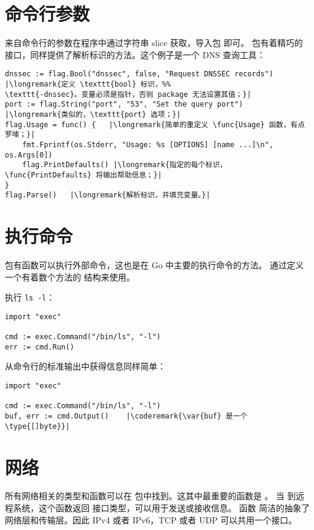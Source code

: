 \section{命令行参数}
\label{sec:option parsing}
来自命令行的参数在程序中通过字符串 slice  获取，导入包  即可。
 包有着精巧的接口，同样提供了解析标识的方法。这个例子是一个 DNS 查询工具：
\begin{lstlisting}
dnssec := flag.Bool("dnssec", false, "Request DNSSEC records") |\longremark{定义 \texttt{bool} 标识，%%
\texttt{-dnssec}。变量必须是指针，否则 package 无法设置其值；}|
port := flag.String("port", "53", "Set the query port")      |\longremark{类似的，\texttt{port} 选项；}|
flag.Usage = func() {   |\longremark{简单的重定义 \func{Usage} 函数，有点罗嗦；}|
    fmt.Fprintf(os.Stderr, "Usage: %s [OPTIONS] [name ...]\n", os.Args[0])
    flag.PrintDefaults() |\longremark{指定的每个标识，\func{PrintDefaults} 将输出帮助信息；}|
}
flag.Parse()   |\longremark{解析标识，并填充变量。}|
\end{lstlisting}
\showremarks

\section{执行命令}
 包有函数可以执行外部命令，这也是在 Go 中主要的执行命令的方法。
通过定义一个有着数个方法的  结构来使用。

执行 \verb|ls -l|：
\begin{lstlisting}
import "exec"

cmd := exec.Command("/bin/ls", "-l")
err := cmd.Run()
\end{lstlisting}
从命令行的标准输出中获得信息同样简单：
\begin{lstlisting}
import "exec"

cmd := exec.Command("/bin/ls", "-l")
buf, err := cmd.Output()    |\coderemark{\var{buf} 是一个 \type{[]byte}}|
\end{lstlisting}

\section{网络}
所有网络相关的类型和函数可以在  包中找到。这其中最重要的函数是 。
当  到远程系统，这个函数返回  接口类型，可以用于发送或接收信息。
函数  简洁的抽象了网络层和传输层。因此 IPv4 或者 IPv6，TCP 或者 UDP 可以共用一个接口。

